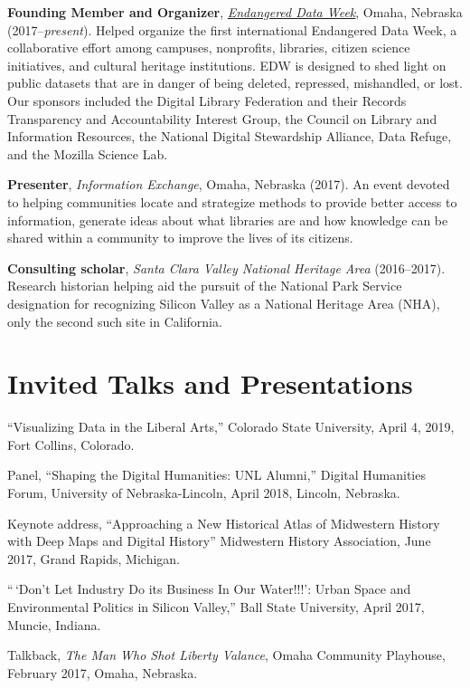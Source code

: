 \textbf{Founding Member and Organizer},
\emph{\href{http://endangereddataweek.org}{Endangered Data Week}},
Omaha, Nebraska (2017--\emph{present}). Helped organize the first
international Endangered Data Week, a collaborative effort among
campuses, nonprofits, libraries, citizen science initiatives, and
cultural heritage institutions. EDW is designed to shed light on public
datasets that are in danger of being deleted, repressed, mishandled, or
lost. Our sponsors included the Digital Library Federation and their
Records Transparency and Accountability Interest Group, the Council on
Library and Information Resources, the National Digital Stewardship
Alliance, Data Refuge, and the Mozilla Science Lab.

\textbf{Presenter}, \emph{Information Exchange}, Omaha, Nebraska (2017).
An event devoted to helping communities locate and strategize methods to
provide better access to information, generate ideas about what
libraries are and how knowledge can be shared within a community to
improve the lives of its citizens.

\textbf{Consulting scholar}, \emph{Santa Clara Valley National Heritage
Area} (2016--2017). Research historian helping aid the pursuit of the
National Park Service designation for recognizing Silicon Valley as a
National Heritage Area (NHA), only the second such site in California.

\section{Invited Talks and
Presentations}\label{invited-talks-and-presentations}

``Visualizing Data in the Liberal Arts,'' Colorado State University,
April 4, 2019, Fort Collins, Colorado.

Panel, ``Shaping the Digital Humanities: UNL Alumni,'' Digital
Humanities Forum, University of Nebraska-Lincoln, April 2018, Lincoln,
Nebraska.

Keynote address, ``Approaching a New Historical Atlas of Midwestern
History with Deep Maps and Digital History'' Midwestern History
Association, June 2017, Grand Rapids, Michigan.

``\,`Don't Let Industry Do its Business In Our Water!!!': Urban Space
and Environmental Politics in Silicon Valley,'' Ball State University,
April 2017, Muncie, Indiana.

Talkback, \emph{The Man Who Shot Liberty Valance}, Omaha Community
Playhouse, February 2017, Omaha, Nebraska.

